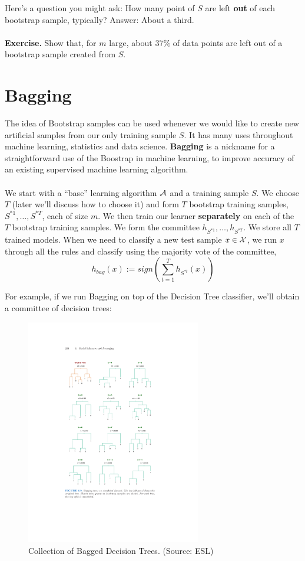 \noindent
Here's a question you might ask: How many point of $S$ are left {\bf out} of each bootstrap sample, typically?
Answer: About a third.
\\~\\
{\bf Exercise.} 
Show that, for $m$ large, about $37\%$ of data points are left out of a
bootstrap sample created from $S$.






\section{Bagging}

The idea of Bootstrap samples can be used whenever we would like to create new
artificial samples from our only training sample $S$. It has many uses
throughout machine learning, statistics and data science. 
{\bf Bagging} is a nickname for a straightforward use of the Boostrap in machine learning, to
improve accuracy of an existing supervised machine learning algorithm.
\\~\\
 We start with a ``base''
learning algorithm $\mathcal{A}$ and a training sample $S$. We choose $T$ (later we'll
discuss how to choose it) and form
$T$ bootstrap training samples, $S^{*1},\ldots, S^{*T}$, each of size $m$. We
then train our learner {\bf separately} on each of the $T$ bootstrap training samples.
We form the committee $h_{S^{*1}},\ldots,h_{S^{*T}}$. We store all $T$ trained
models. When we need to classify a new test sample $x\in\mathcal{X}$,
we run $x$ through all the rules and classify using the 
majority vote of the committee,
\[
  h_{bag}(x) := sign\left( \sum_{t=1}^T h_{S^{*t}} (x)\right)
\]

For example, if we run Bagging on top of the Decision Tree classifier, we'll
obtain a committee of decision trees:
\begin{figure}[H]
  \centering
  \includegraphics[width=3in]{many_trees.pdf}
  \caption{Collection of Bagged Decision Trees. (Source: ESL)}
\end{figure}





